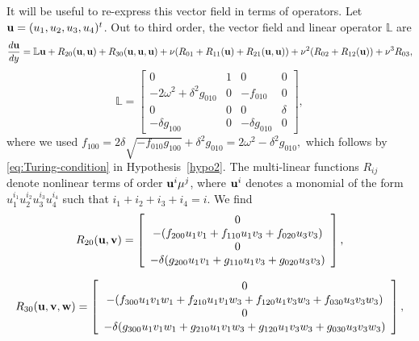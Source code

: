 \documentclass[11pt]{article}
\numberwithin{equation}{section}
\begin{document}
It will be useful to re-express this vector field in terms of operators.
Let ${\bf u}=(u_1, u_2, u_3, u_4)^t$.
Out to third order, the vector field and linear operator $\mathbb{L}$ are 
\begin{equation}
\frac{d {\bf u}}{dy} = \mathbb{L} {\bf u }+ R_{20} ({\bf u}, {\bf u })
+ R_{30} ({\bf u}, {\bf u}, {\bf u })
+ \nu (R_{01} + R_{11} ({\bf u}) + R_{21} ({\bf u}, {\bf u})) 
+ \nu^2 ( R_{02} + R_{12}({\bf u}))
+ \nu ^3 R_{03},
\end{equation}
\begin{equation}
\mathbb{L} =
\left[
\begin{array}{cccc}
0 & 1 & 0 & 0 \\
-2\omega^2 + \delta^2 g_{010} & 0 & -f_{010} & 0 \\
0 & 0 & 0 & \delta \\
-\delta g_{100} & 0 & -\delta g_{010} & 0
\end{array}
\right],
\end{equation}
where we used
$f_{100} = 2\delta \sqrt{-f_{010} g_{100}} + \delta^2 g_{010} =2 \omega^2 -\delta^2 g_{010},$
which follows by \eqref{eq:Turing-condition} in Hypothesis~\ref{hypo2}.
The multi-linear functions $R_{ij}$ denote nonlinear terms of order ${\bf u}^i \mu^j$, where ${\bf u}^i$ denotes a monomial of the form $u_1^{i_1} u_2^{i_2} u_3^{i_3} u_4^{i_4}$ such that $i_1+i_2+i_3+i_4 = i$.
We find
\begin{equation}
R_{20} ({\bf u}, {\bf v}) =
\left[
\begin{array}{c}
0 \\
-(f_{200} u_1 v_1 + f_{110} u_1 v_3 + f_{020} u_3 v_3) \\
0 \\
-\delta (g_{200} u_1 v_1 + g_{110} u_1 v_3 + g_{020} u_3 v_3)
\end{array}
\right],
\end{equation}

\begin{equation}
R_{30} ({\bf u}, {\bf v}, {\bf w}) =
\left[
\begin{array}{c}
0 \\
-(f_{300} u_1 v_1 w_1 + f_{210} u_1 v_1 w_3 + f_{120} u_1 v_3 w_3 + f_{030} u_3 v_3 w_3) \\
0 \\
-\delta (g_{300} u_1 v_1 w_1 + g_{210} u_1 v_1 w_3 + g_{120} u_1 v_3 w_3
+ g_{030} u_3 v_3 w_3)
\end{array}
\right],
\end{equation}
\end{document}
